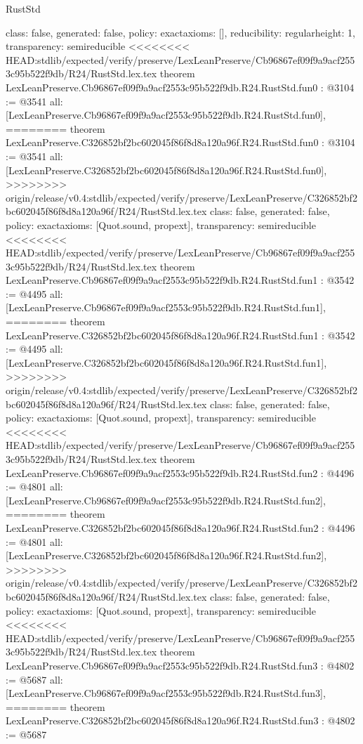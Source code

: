 \begin{lexlean}{RustStd}
\begin{coremodule}
{\begin{coremodule}
{{{  class: false,
  generated: false,
  policy: exact{axioms: []},
  reducibility: regular{height: 1},
  transparency: semireducible
}
<<<<<<<< HEAD:stdlib/expected/verify/preserve/LexLeanPreserve/Cb96867ef09f9a9acf2553c95b522f9db/R24/RustStd.lex.tex
theorem LexLeanPreserve.Cb96867ef09f9a9acf2553c95b522f9db.R24.RustStd.fun0 : @3104 := @3541 {
  all: [LexLeanPreserve.Cb96867ef09f9a9acf2553c95b522f9db.R24.RustStd.fun0],
========
theorem LexLeanPreserve.C326852bf2bc602045f86f8d8a120a96f.R24.RustStd.fun0 : @3104 := @3541 {
  all: [LexLeanPreserve.C326852bf2bc602045f86f8d8a120a96f.R24.RustStd.fun0],
>>>>>>>> origin/release/v0.4:stdlib/expected/verify/preserve/LexLeanPreserve/C326852bf2bc602045f86f8d8a120a96f/R24/RustStd.lex.tex
  class: false,
  generated: false,
  policy: exact{axioms: [Quot.sound, propext]},
  transparency: semireducible
}
<<<<<<<< HEAD:stdlib/expected/verify/preserve/LexLeanPreserve/Cb96867ef09f9a9acf2553c95b522f9db/R24/RustStd.lex.tex
theorem LexLeanPreserve.Cb96867ef09f9a9acf2553c95b522f9db.R24.RustStd.fun1 : @3542 := @4495 {
  all: [LexLeanPreserve.Cb96867ef09f9a9acf2553c95b522f9db.R24.RustStd.fun1],
========
theorem LexLeanPreserve.C326852bf2bc602045f86f8d8a120a96f.R24.RustStd.fun1 : @3542 := @4495 {
  all: [LexLeanPreserve.C326852bf2bc602045f86f8d8a120a96f.R24.RustStd.fun1],
>>>>>>>> origin/release/v0.4:stdlib/expected/verify/preserve/LexLeanPreserve/C326852bf2bc602045f86f8d8a120a96f/R24/RustStd.lex.tex
  class: false,
  generated: false,
  policy: exact{axioms: [Quot.sound, propext]},
  transparency: semireducible
}
<<<<<<<< HEAD:stdlib/expected/verify/preserve/LexLeanPreserve/Cb96867ef09f9a9acf2553c95b522f9db/R24/RustStd.lex.tex
theorem LexLeanPreserve.Cb96867ef09f9a9acf2553c95b522f9db.R24.RustStd.fun2 : @4496 := @4801 {
  all: [LexLeanPreserve.Cb96867ef09f9a9acf2553c95b522f9db.R24.RustStd.fun2],
========
theorem LexLeanPreserve.C326852bf2bc602045f86f8d8a120a96f.R24.RustStd.fun2 : @4496 := @4801 {
  all: [LexLeanPreserve.C326852bf2bc602045f86f8d8a120a96f.R24.RustStd.fun2],
>>>>>>>> origin/release/v0.4:stdlib/expected/verify/preserve/LexLeanPreserve/C326852bf2bc602045f86f8d8a120a96f/R24/RustStd.lex.tex
  class: false,
  generated: false,
  policy: exact{axioms: [Quot.sound, propext]},
  transparency: semireducible
}
<<<<<<<< HEAD:stdlib/expected/verify/preserve/LexLeanPreserve/Cb96867ef09f9a9acf2553c95b522f9db/R24/RustStd.lex.tex
theorem LexLeanPreserve.Cb96867ef09f9a9acf2553c95b522f9db.R24.RustStd.fun3 : @4802 := @5687 {
  all: [LexLeanPreserve.Cb96867ef09f9a9acf2553c95b522f9db.R24.RustStd.fun3],
========
theorem LexLeanPreserve.C326852bf2bc602045f86f8d8a120a96f.R24.RustStd.fun3 : @4802 := @5687 {
}}}}}}}
\end{coremodule}}
\end{coremodule}
\end{lexlean}

